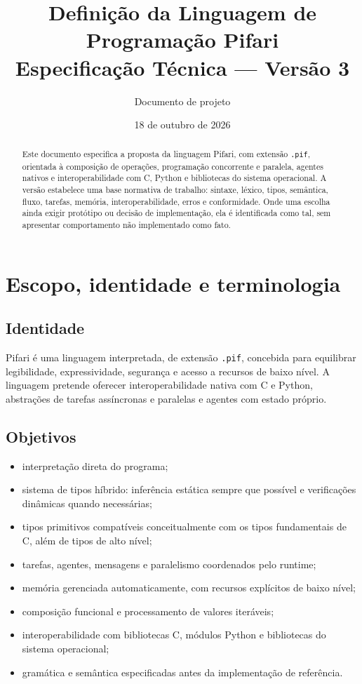 \documentclass[12pt,a4paper]{article}
\title{Definição da Linguagem de Programação Pifari\\Especificação Técnica — Versão 3}
\author{Documento de projeto}
\date{18 de outubro de 2026}
\begin{document}
\maketitle
\begin{abstract}
Este documento especifica a proposta da linguagem Pifari, com extensão \texttt{.pif}, orientada à composição de operações, programação concorrente e paralela, agentes nativos e interoperabilidade com C, Python e bibliotecas do sistema operacional. A versão estabelece uma base normativa de trabalho: sintaxe, léxico, tipos, semântica, fluxo, tarefas, memória, interoperabilidade, erros e conformidade. Onde uma escolha ainda exigir protótipo ou decisão de implementação, ela é identificada como tal, sem apresentar comportamento não implementado como fato.
\end{abstract}
\tableofcontents
\newpage
\section{Escopo, identidade e terminologia}
\subsection{Identidade}
Pifari é uma linguagem interpretada, de extensão \texttt{.pif}, concebida para equilibrar legibilidade, expressividade, segurança e acesso a recursos de baixo nível. A linguagem pretende oferecer interoperabilidade nativa com C e Python, abstrações de tarefas assíncronas e paralelas e agentes com estado próprio.
\subsection{Objetivos}
\begin{itemize}
\item interpretação direta do programa;
\item sistema de tipos híbrido: inferência estática sempre que possível e verificações dinâmicas quando necessárias;
\item tipos primitivos compatíveis conceitualmente com os tipos fundamentais de C, além de tipos de alto nível;
\item tarefas, agentes, mensagens e paralelismo coordenados pelo runtime;
\item memória gerenciada automaticamente, com recursos explícitos de baixo nível;
\item composição funcional e processamento de valores iteráveis;
\item interoperabilidade com bibliotecas C, módulos Python e bibliotecas do sistema operacional;
\item gramática e semântica especificadas antes da implementação de referência.
\end{itemize}
\end{document}
